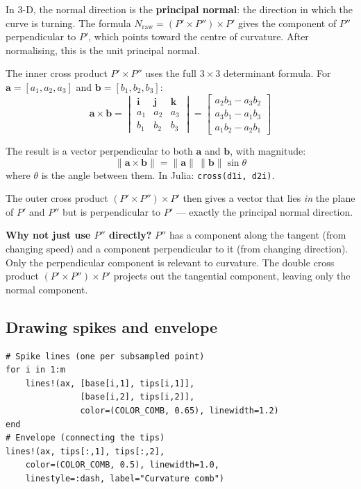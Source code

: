 \documentclass[12pt, a4paper]{article}
\newcommand{\cd}[1]{\texttt{#1}}
\begin{document}
In 3-D, the normal direction is the \textbf{principal normal}:
the direction in which the curve is turning.
The formula $N_\text{raw} = (P' \times P'') \times P'$ gives the
component of $P''$ perpendicular to $P'$, which points
toward the centre of curvature.
After normalising, this is the unit principal normal.

The inner cross product $P' \times P''$ uses the
full $3\times3$ determinant formula.
For $\mathbf{a} = [a_1, a_2, a_3]$ and
$\mathbf{b} = [b_1, b_2, b_3]$:
\[
  \mathbf{a} \times \mathbf{b}
  = \begin{vmatrix}
      \mathbf{i} & \mathbf{j} & \mathbf{k} \\
      a_1 & a_2 & a_3 \\
      b_1 & b_2 & b_3
    \end{vmatrix}
  = \begin{bmatrix}
      a_2 b_3 - a_3 b_2 \\
      a_3 b_1 - a_1 b_3 \\
      a_1 b_2 - a_2 b_1
    \end{bmatrix}
\]

The result is a vector perpendicular to both
$\mathbf{a}$ and $\mathbf{b}$, with magnitude:
\[
  \|\mathbf{a} \times \mathbf{b}\| = \|\mathbf{a}\|\,\|\mathbf{b}\|\sin\theta
\]
where $\theta$ is the angle between them.
In Julia: \cd{cross(d1i, d2i)}.

The outer cross product $(P' \times P'') \times P'$
then gives a vector that lies \emph{in} the plane of
$P'$ and $P''$ but is perpendicular to $P'$ --- exactly
the principal normal direction.

\begin{notebox}
\textbf{Why not just use $P''$ directly?}
$P''$ has a component along the tangent (from changing speed)
and a component perpendicular to it (from changing direction).
Only the perpendicular component is relevant to curvature.
The double cross product $(P' \times P'') \times P'$
projects out the tangential component, leaving only the
normal component.
\end{notebox}

\subsection{Drawing spikes and envelope}

\begin{verbatim}
# Spike lines (one per subsampled point)
for i in 1:m
    lines!(ax, [base[i,1], tips[i,1]],
               [base[i,2], tips[i,2]],
               color=(COLOR_COMB, 0.65), linewidth=1.2)
end
# Envelope (connecting the tips)
lines!(ax, tips[:,1], tips[:,2],
    color=(COLOR_COMB, 0.5), linewidth=1.0,
    linestyle=:dash, label="Curvature comb")
\end{verbatim}
\end{document}
